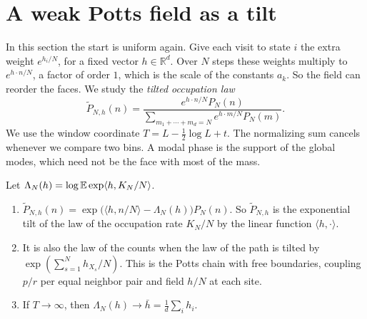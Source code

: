 \section{A weak Potts field as a tilt}\label{sec:frontier-modes}

In this section the start is uniform again. Give each visit to state $i$ the
extra weight $e^{h_i/N}$, for a fixed vector $h\in\mathbb R^d$. Over $N$ steps
these weights multiply to $e^{h\cdot n/N}$, a factor of order $1$, which is the
scale of the constants $a_k$. So the field can reorder the faces. We study the
\emph{tilted occupation law}
\begin{equation}\label{eq:weakfield-law}
 \widetilde P_{N,h}(n)=
 \frac{e^{h\cdot n/N}P_N(n)}
 {\sum_{m_1+\cdots+m_d=N}e^{h\cdot m/N}P_N(m)}.
\end{equation}
We use the window coordinate $T=L-\frac12\log L+t$. The normalizing sum cancels
whenever we compare two bins. A modal phase is the support of the global
modes, which need not be the face with most of the mass.

\begin{proposition}\label{prop:field-tilt}
Let $\Lambda_N(h)=\log\mathbb E\exp\langle h,K_N/N\rangle$.
\begin{enumerate}[(1)]
\item $\widetilde P_{N,h}(n)=\exp\bigl(\langle h,n/N\rangle-\Lambda_N(h)\bigr)P_N(n)$.
So $\widetilde P_{N,h}$ is the exponential tilt of the law of the occupation
rate $K_N/N$ by the linear function $\langle h,\cdot\rangle$.
\item It is also the law of the counts when the law of the path is tilted by
$\exp(\sum_{s=1}^Nh_{X_s}/N)$. This is the Potts chain with free boundaries,
coupling $p/r$ per equal neighbor pair and field $h/N$ at each site.
\item If $T\to\infty$, then $\Lambda_N(h)\to\bar h=\frac1d\sum_ih_i$.
\end{enumerate}
\end{proposition}


